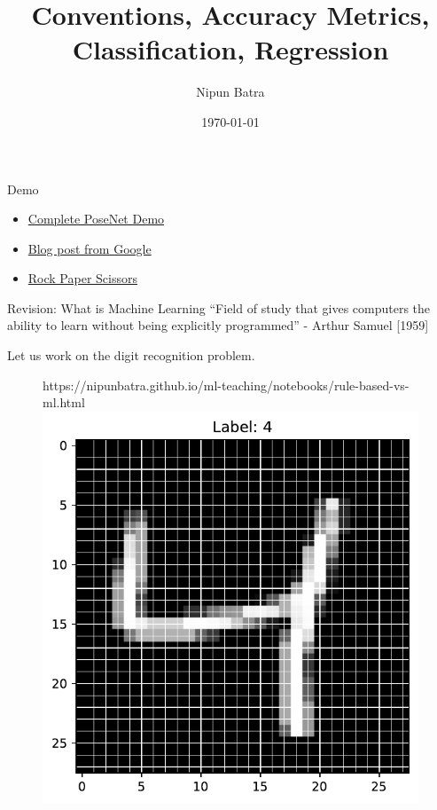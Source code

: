 \documentclass[usenames,dvipsnames]{beamer}
\title{Conventions, Accuracy Metrics, Classification, Regression}
\date{\today}
\author{Nipun Batra}
\institute{IIT Gandhinagar}
\begin{document}
%

  \maketitle
  
  \begin{frame}{Demo}
	\begin{itemize}
		\item \href{https://storage.googleapis.com/tfjs-models/demos/posenet/camera.html}{Complete PoseNet Demo}
		\item \href{https://blog.tensorflow.org/2018/05/real-time-human-pose-estimation-in.html}{Blog post from Google}
		\item \href{https://rps-tfjs.netlify.app}{Rock Paper Scissors}
	\end{itemize}
  \end{frame}
  

 
  \begin{frame}{Revision: What is Machine Learning}
	 ``Field of study that gives computers the ability to learn
		without being explicitly programmed'' - Arthur Samuel
		[1959]

		\pause Let us work on the digit recognition problem.

		\begin{figure}[htp]
			\centering
			\begin{notebookbox}{https://nipunbatra.github.io/ml-teaching/notebooks/rule-based-vs-ml.html}
			  \includegraphics[scale=0.35]{../assets/accuracy-convention/figures/mnist.pdf}
			\end{notebookbox}
		  \end{figure}
		


	\end{frame}
		
\end{document}
